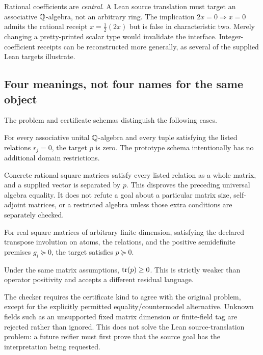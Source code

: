 Rational coefficients are \emph{central}. A Lean source translation must target
an associative $\mathbb Q$-algebra, not an arbitrary ring. The implication $2x=0
\Rightarrow x=0$ admits the rational receipt $x=\tfrac12(2x)$ but is false in
characteristic two. Merely changing a pretty-printed scalar type would invalidate
the interface. Integer-coefficient receipts can be reconstructed more generally,
as several of the supplied Lean targets illustrate.

\subsection{Four meanings, not four names for the same object}

The problem and certificate schemas distinguish the following cases.

\begin{description}[style=nextline,leftmargin=0pt,labelwidth=0pt,labelsep=0pt]
\item[Algebra equality.]
For every associative unital $\mathbb Q$-algebra and every tuple satisfying the listed
relations $r_j=0$, the target $p$ is zero. The prototype schema intentionally
has no additional domain restrictions.
\item[Algebra countermodel.]
Concrete rational square matrices satisfy every listed relation as a whole
matrix, and a supplied vector is separated by $p$. This disproves the preceding
universal algebra equality. It does not refute a goal about a particular matrix
size, self-adjoint matrices, or a restricted algebra unless those extra
conditions are separately checked.
\item[Operator positivity.]
For real square matrices of arbitrary finite dimension, satisfying the declared
transpose involution on atoms, the relations, and the positive semidefinite
premises $g_i\succeq0$, the target satisfies $p\succeq0$.
\item[Trace positivity.]
Under the same matrix assumptions, $\operatorname{tr}(p)\ge0$. This is strictly weaker than
operator positivity and accepts a different residual language.
\end{description}

The checker requires the certificate kind to agree with the original problem,
except for the explicitly permitted equality/countermodel alternative. Unknown
fields such as an unsupported fixed matrix dimension or finite-field tag are
rejected rather than ignored. This does not solve the Lean source-translation
problem: a future reifier must first prove that the source goal has the
interpretation being requested.

